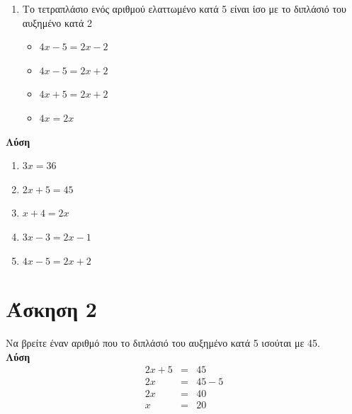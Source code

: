 \documentclass[a4paper,10pt]{report}
\begin{document}
\begin{enumerate}[1)]
\begin{multicols}{4}
\begin{itemize}
 \item $3x-3=2x+1$
\end{itemize}
\end{multicols}
\item Το τετραπλάσιο ενός αριθμού ελαττωμένο κατά 5 είναι ίσο με το διπλάσιό του αυξημένο κατά 2 %
\begin{multicols}{4}
\begin{itemize}
 \item $4x-5=2x-2$
 \item $4x-5=2x+2$
 \item $4x+5=2x+2$
 \item $4x=2x$
\end{itemize}
\end{multicols}
\end{enumerate}
\textbf{Λύση}
\begin{enumerate}[1)]
 \item $3x=36$
 \item $2x+5=45$
 \item $x+4=2x$
 \item $3x-3=2x-1$
 \item $4x-5=2x+2$
\end{enumerate}


\section*{Άσκηση 2  \hfill \small{}}
Να βρείτε έναν αριθμό που το διπλάσιό του αυξημένο κατά 5 ισούται με 45.\\
\textbf{Λύση}\\
\begin{eqnarray*}
  2x+5  &=&  45\\
  2x    &=&  45-5\\
  2x    &=&  40\\
   x    &=&  20
\end{eqnarray*}
\end{document}
